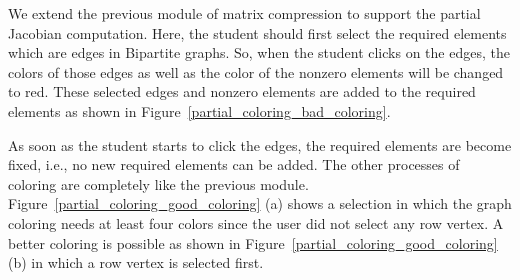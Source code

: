 \documentclass[12pt, twoside,a4paper,toc=bibliography]{scrbook}
\begin{document}
We extend the previous module of matrix compression to support
the partial Jacobian computation. Here, the student should
first select the required elements which are edges in Bipartite graphs.
So, when the student clicks on the edges, the colors of those edges 
as well as the color of the nonzero elements will be changed to red.
These selected edges and nonzero elements are added to the required elements
as shown in Figure~\ref{partial_coloring_bad_coloring}.

As soon as the student starts to click the edges, the required elements
are become fixed, i.e., no new required elements can be added.
The other processes of coloring are completely like the previous module.
Figure~\ref{partial_coloring_good_coloring} (a) shows a selection in which the graph coloring
needs at least four colors since the user did not select any row vertex.
A better coloring is possible as shown in Figure~\ref{partial_coloring_good_coloring} (b)
in which a row vertex is selected first.
\end{document}
